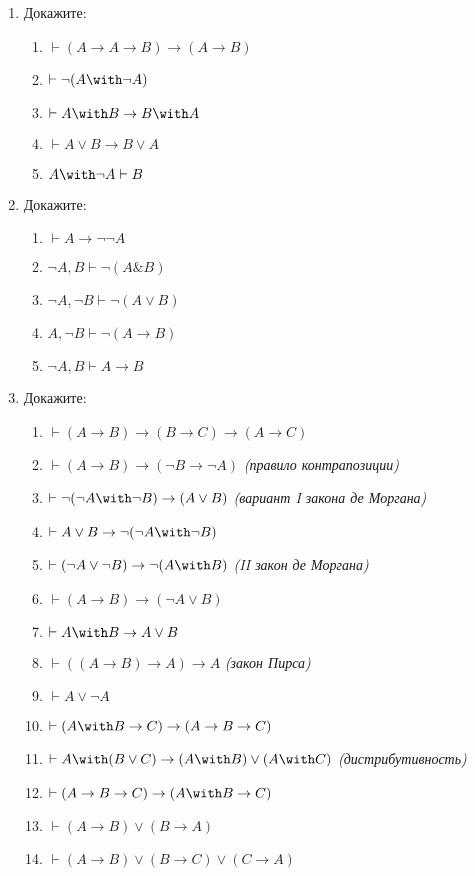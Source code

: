 \documentclass[10pt,a4paper,oneside]{article}
\begin{document}
\begin{enumerate}
\item Докажите:
\begin{enumerate}
\item $\vdash (A \rightarrow A \rightarrow B) \rightarrow (A \rightarrow B)$
\item $\vdash \neg (A \with \neg A)$
\item $\vdash A \with B \rightarrow B \with A$
\item $\vdash A \vee B \rightarrow B \vee A$
\item $A \with \neg A \vdash B$
\end{enumerate}

\item Докажите:
\begin{enumerate}
\item $\vdash A \rightarrow \neg \neg A$
\item $\neg A, B \vdash \neg(A\& B)$
\item $\neg A,\neg B \vdash \neg( A\vee B)$
\item $ A,\neg B \vdash \neg( A\rightarrow B)$
\item $\neg A, B \vdash  A\rightarrow B$
\end{enumerate}

\item Докажите:
\begin{enumerate}
\item $\vdash (A \rightarrow B) \rightarrow (B \rightarrow C) \rightarrow (A \rightarrow C)$ 
\item $\vdash (A \rightarrow B) \rightarrow (\neg B \rightarrow \neg A)$ \emph{(правило контрапозиции)}
\item $\vdash \neg (\neg A \with \neg B) \rightarrow (A \vee B)$ \emph{(вариант I закона де Моргана)}
\item $\vdash A \vee B \rightarrow \neg(\neg A \with \neg B)$
\item $\vdash (\neg A \vee \neg B) \rightarrow \neg (A \with B)$ \emph{(II закон де Моргана)}
\item $\vdash (A \rightarrow B) \rightarrow (\neg A \vee B)$
\item $\vdash A \with B \rightarrow A \vee B$
\item $\vdash ((A \rightarrow B) \rightarrow A)\rightarrow A$ \emph{(закон Пирса)}
\item $\vdash A \vee \neg A$
\item $\vdash (A \with B \rightarrow C) \rightarrow (A \rightarrow B \rightarrow C)$
\item $\vdash A \with (B \vee C) \rightarrow (A \with B) \vee (A \with C)$ \emph{(дистрибутивность)}
\item $\vdash (A \rightarrow B \rightarrow C) \rightarrow (A \with B \rightarrow C)$
\item $\vdash (A \rightarrow B) \vee (B \rightarrow A)$
\item $\vdash (A \rightarrow B) \vee (B \rightarrow C) \vee (C \rightarrow A)$
\end{enumerate}


\end{enumerate}
\end{document}
